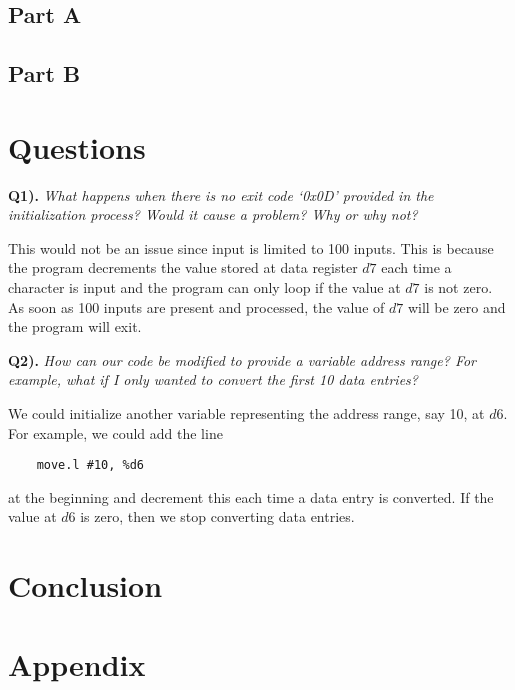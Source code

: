 \documentclass[10pt, letterpaper, titlepage]{article} %
\begin{document}
\begin{multicols*}{2}
\subsection{Part A}

\subsection{Part B}


\section{Questions}
\textbf{Q1).} \textit{What happens when there is no exit code `0x0D' provided in the initialization process? Would it cause a problem? Why or why not?}

This would not be an issue since input is limited to 100 inputs. 
This is because the program decrements the value stored at data register $d7$ each time a character is input and the program can only loop if the value at $d7$ is not zero. 
As soon as 100 inputs are present and processed, the value of $d7$ will be zero and the program will exit.

\textbf{Q2).} \textit{How can our code be modified to provide a variable address range? For example, what if I only wanted to convert the first 10 data entries?}

We could initialize another variable representing the address range, say 10, at $d6$. 
For example, we could add the line
\begin{lstlisting}
	move.l #10, %d6
\end{lstlisting}
at the beginning and decrement this each time a data entry is converted. 
If the value at $d6$ is zero, then we stop converting data entries.

\section{Conclusion}


\end{multicols*}


\section{Appendix}
\end{document}
